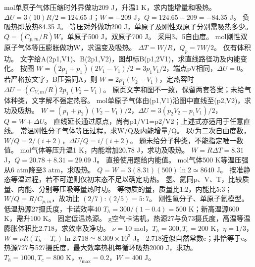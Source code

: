  mol单原子气体压缩时外界做功209 J，升温1 K，求内能增量和吸热。
\workings $\Delta U=3(10)R/2=124.65$ J；$W=-209$ J，$Q=124.65-209=-84.35$ J。
\crosscheck 负吸热即放热84.35 J。
\problemtext 等压对外做功200 J，单原子及刚性双原子分别需吸热多少。
\workings $Q=(C_{p,m}/R)W$，单原子500 J，双原子700 J。
\crosscheck 采用3、5自由度。
 mol刚性双原子气体等压膨胀做功W，求温变及吸热。
\workings $\Delta T=W/R$，$Q_p=7W/2$。
\crosscheck 仅有体积功。
\problemtext 文字给A(2p1,V1)、B(2p1,V2)，图却标B(p1,2V1)，求直线路径功及内能变化。
\workings 按图 $W=(2p_1+p_1)(2V_1-V_1)/2=3p_1V_1/2$，端点pV相同，$\Delta U=0$。若严格按文字，B压强同A，则 $W=2p_1(V_2-V_1)$，定热容时 $\Delta U=(C_{V,m}/R)2p_1(V_2-V_1)$。
\crosscheck 原页文字和图不一致，保留两套答案；未给气体种类，文字解不强定热容。
 mol单原子气体由(p1,V1)沿图中直线至(p2,V2)，求功及吸热。
\workings $W=(p_1+p_2)(V_2-V_1)/2$，$\Delta U=3(p_2V_2-p_1V_1)/2$，$Q=W+\Delta U$。
\crosscheck 直线延长通过原点，尚有p1/V1=p2/V2；上述式亦适用于任意直线。
\problemtext 常温刚性分子气体等压过程，求W/Q及内能增量/Q。
\workings 以i为二次自由度数，$W/Q=2/(i+2)$，$\Delta U/Q=i/(i+2)$。
\crosscheck 题未给分子种类，不能指定唯一数值。
 mol气体等压升温1 K，内能增加20.78 J，求功及吸热。
\workings $W=R\Delta T=8.31$ J，$Q=20.78+8.31=29.09$ J。
\crosscheck 直接使用题给内能值。
 mol气体500 K等温压强从6 atm降至3 atm，求吸热。
\workings $Q=W=3(8.31)(500)\ln2\simeq8640$ J。
\crosscheck 按准静态等温过程，若不可逆则仅初末态不足以确定功热。
\problemtext 氢、氦同p、V、T，比较质量、内能、分别等压吸等量热时功。
\workings 等物质的量，质量比1:2，内能比5:3；$W/Q=R/C_{p,m}$，故功比 $(2/7):(2/5)=5:7$。
\crosscheck 刚性氢分子、单原子氦模型。
\problemtext 低温热源27摄氏度，卡诺效率40%
\workings $T_h=300/(1-0.4)=500$ K；新高温源600 K，需升100 K。
\crosscheck 固定低温热源。
 g空气卡诺机，热源27与负73摄氏度，高温等温膨胀体积比2.718，求效率及净功。
\workings $\nu=10$ mol，$T_h=300,T_c=200$ K，$\eta=1/3$，$W=\nu R(T_h-T_c)\ln2.718\simeq8.309\times10^3$ J。
\crosscheck 2.718近似自然常数e；非恰等于e。
\problemtext 热源727与527摄氏度，最大效率热机每循环吸热2000 J，求功。
\workings $T_h=1000,T_c=800$ K，$\eta_{\max}=0.2$，$W=400$ J。
